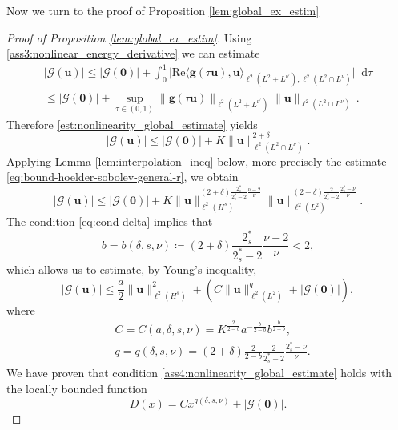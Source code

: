 \documentclass[12pt,a4paper]{amsart}
\numberwithin{equation}{section}
\newcommand{\ulu}{\boldsymbol{u}}
\newcommand{\ulg}{\boldsymbol{g}}
\newcommand*\diff{\mathop{}\!\mathrm{d}}
\newcommand{\twoasts}{{2^*_s}}
\begin{document}
	
	Now we turn to the proof of Proposition \ref{lem:global_ex_estim}
	\begin{proof}[Proof of Proposition \ref{lem:global_ex_estim}]
		Using \ref{ass3:nonlinear_energy_derivative} we can estimate 
		\begin{multline}
			| \mathscr{G}(\ulu) | \leq | \mathscr{G}(\boldsymbol{0}) | + \int_{0}^1 \big|\mathrm{Re} \langle \ulg(\tau \ulu) , \ulu \rangle_{\ell^2(L^2+L^{\nu^\prime}),\ell^2(L^2\cap L^{\nu})} \big| \diff \tau \\
			\leq | \mathscr{G}(\boldsymbol{0}) | + \sup_{\tau \in (0,1)} \| \ulg(\tau \ulu) \|_{\ell^2(L^2+L^{\nu^\prime})} \| \ulu \|_{\ell^2(L^2\cap L^{\nu})}\,.
		\end{multline}
		Therefore \eqref{est:nonlinearity_global_estimate} yields
		\begin{equation}
			| \mathscr{G}(\ulu) | \leq | \mathscr{G}(\boldsymbol{0}) | + K \| \ulu \|_{\ell^2(L^2\cap L^\nu)}^{2+\delta} .
		\end{equation}
		Applying Lemma \ref{lem:interpolation_ineq} below, more precisely the estimate \eqref{eq:bound-hoelder-sobolev-general-r}, we obtain
		\begin{equation}
			| \mathscr{G}(\ulu) | \leq | \mathscr{G}(\boldsymbol{0}) | + K \| \ulu \|_{\ell^2(H^s)}^{(2+\delta)\frac{\twoasts }{\twoasts -2} \frac{\nu-2}{\nu} } \| \ulu \|_{\ell^2(L^2)}^{(2+\delta)\frac{2}{\twoasts -2}\frac{\twoasts -\nu}{\nu} } .
		\end{equation}
		The condition \eqref{eq:cond-delta} implies that
		\begin{equation}
			b=b(\delta,s,\nu) \coloneq (2+\delta)\frac{\twoasts }{\twoasts -2} \frac{\nu-2}{\nu} < 2,
		\end{equation}
		which allows us to estimate, by Young's inequality,
		\begin{equation}
			| \mathscr{G}(\ulu) | \leq \frac{a}{2} \| \ulu \|_{\ell^2(H^s)}^2 + ( C \| \ulu \|_{\ell^2(L^2)}^{q} + | \mathscr{G}(\boldsymbol{0}) | ),
		\end{equation}
		where 
		\begin{align*} 
			&C = C(a,\delta,s,\nu) = K^{\frac{2}{2-b}}a^{-\frac{b}{2-b}} b^{\frac{b}{2-b}} , \\
			&q = q(\delta,s,\nu) = (2+\delta)\frac{2}{2-b}\frac{2}{\twoasts -2} \frac{\twoasts -\nu}{\nu} .
		\end{align*}
		We have proven that condition \ref{ass4:nonlinearity_global_estimate} holds with the locally bounded function
		\begin{equation}
			D(x) = Cx^{q(\delta,s,\nu)} + | \mathscr{G}(\boldsymbol{0}) | .
		\end{equation}
	\end{proof}
	
\end{document}
